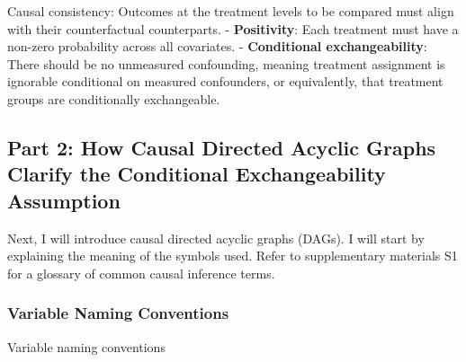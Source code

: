 \documentclass[
  single column]{article}
\begin{document}
Causal consistency: Outcomes at the treatment levels to be compared must
align with their counterfactual counterparts. - \textbf{Positivity}:
Each treatment must have a non-zero probability across all covariates. -
\textbf{Conditional exchangeability}: There should be no unmeasured
confounding, meaning treatment assignment is ignorable conditional on
measured confounders, or equivalently, that treatment groups are
conditionally exchangeable.

\newpage{}

\subsection{Part 2: How Causal Directed Acyclic Graphs Clarify the
Conditional Exchangeability Assumption}\label{id-sec-2}

Next, I will introduce causal directed acyclic graphs (DAGs). I will
start by explaining the meaning of the symbols used. Refer to
supplementary materials S1 for a glossary of common causal inference
terms.

\subsubsection{Variable Naming
Conventions}\label{variable-naming-conventions}

\begin{table}

\caption{\label{tbl-terminology}Variable naming conventions}

\centering{

\terminologylocalconventionssimple

}

\end{table}%
\end{document}
